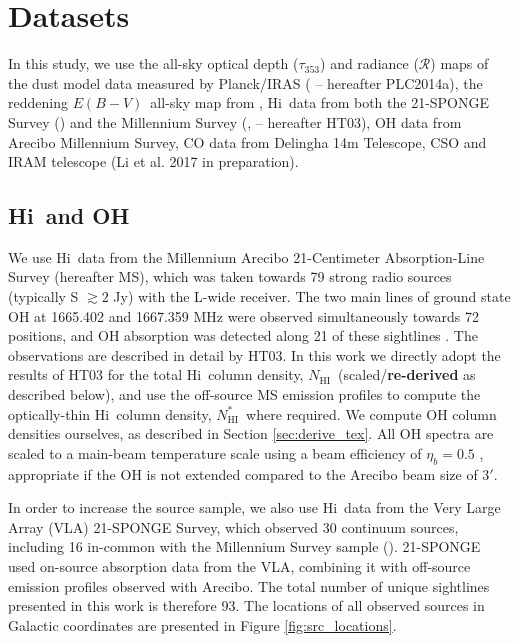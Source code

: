 \documentclass[preprint]{emulateapj}
\def\ebv{$E(B{-}V)$}
\def\hi{H{\sc i}}
\def\NHI{$N_\mathrm{HI}$}
\def\NHIthin{$N^{*}_\mathrm{HI}$}
\def\t353{$\tau_{353}$}
\def\rad{$\mathcal{R}$}
\begin{document}
\section{Datasets}
In this study, we use the all-sky optical depth (\t353) and radiance (\rad) maps of the dust model data measured by Planck/IRAS (\citealt{PLC2014} -- hereafter PLC2014a), %
the reddening \ebv\ all-sky map from \citet{Schlafly2011}, \hi\ data from both the 21-SPONGE Survey (\citealt{Murray2015}) and the Millennium Survey (\citealt{Heiles2003a}, \citealt{Heiles2003b} -- hereafter HT03), OH data from Arecibo Millennium Survey, CO data from Delingha 14m Telescope, CSO and IRAM telescope (Li et al. 2017 in preparation). %
\label{sec:observations}

\subsection{\hi\ and OH}
\label{subsec:data_hi_oh}
We use \hi\ data from the Millennium Arecibo 21-Centimeter Absorption-Line Survey (hereafter MS), which was taken towards 79 strong radio sources (typically S $\gtrsim 2$ Jy) with the L-wide receiver.
The two main lines of ground state OH at 1665.402 and 1667.359 MHz were observed simultaneously towards 72 positions, and OH absorption was detected along 21 of these sightlines \citep[see also][]{Li2017}. The observations are described in detail by HT03. In this work we directly adopt the results of HT03 for the total \hi\ column density, \NHI\ (scaled/\textbf{re-derived} as described below), and use the off-source MS emission profiles to compute the optically-thin \hi\ column density, \NHIthin\ where required. We compute OH column densities ourselves, as described in Section \ref{sec:derive_tex}. All OH spectra are scaled to a main-beam temperature scale using a beam efficiency of $\eta_{b} = 0.5$ \citep{heiles2001}, appropriate if the OH is not extended compared to the Arecibo beam size of $3'$.

In order to increase the source sample, we also use \hi\ data from the Very Large Array (VLA) 21-SPONGE Survey, which observed 30 continuum sources, including 16 in-common with the Millennium Survey sample (\citealt{Murray2015}). 21-SPONGE used on-source absorption data from the VLA, combining it with off-source emission profiles observed with Arecibo. The total number of unique sightlines presented in this work is therefore 93. The locations of all observed sources in Galactic coordinates are presented in Figure \ref{fig:src_locations}. 
\end{document}
